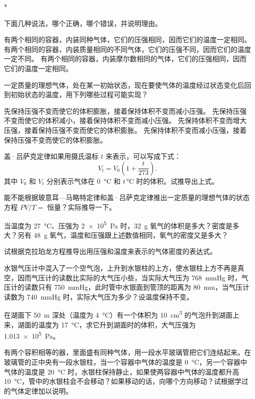 \begin{Exercise}*
\begin{question}
	\item 下面几种说法，哪个正确，哪个错误，并说明理由。
	\begin{tasks}
		\task 有两个相同的容器，内装同种气体，它们的压强相同，因而它们的温度一定相同。
		\task 有两个相同的容器，内装质量相同的不同气体，它们的压强不同，因而它们的温度一定不同。
		\task 有两个相同的容器，内装摩尔数相同的气体，它们的压强相同，因而它们的温度一定相同。
	\end{tasks}
	\item 一定质量的理想气体，处在某一初始状态，现在要使气体的温度经过状态变化后回到初始状态的温度，用下列哪些过程可能实现？
	\begin{tasks}
		\task 先保持压强不变而使它的体积膨胀，接着保持体积不变而减小压强。
		\task 先保持压强不变而使它的体积减小，接着保持体积不变而减小压强。
		\task 先保持体积不变而增大压强，接着保持压强不变而使它的体积膨胀。
		\task 先保持体积不变而减小压强，接着保持压强不变而使它的体积膨胀。	 
	\end{tasks}
	\item 盖·吕萨克定律如果用摄氏温标 $t$ 来表示，可以写成下式：
	\[V_t=V_0\left(1+\frac{t}{273}\right).\]
	其中 $V_0$ 和 $V_t$ 分别表示气体在 \qty{0}{\celsius} 和 $t$\,\unit{\celsius} 时的体积。试推导出上式。
	\item 能不能根据玻意耳—马略特定律和盖·吕萨克定律推出一定质量的理想气体的状态方程 $PV/T=$ 恒量？实际推导一下。
	\item 当温度为 \qty{27}{\celsius}、压强为 \qty{2e5}{Pa} 时，\qty{32}{g} 氧气的体积是多大？密度是多大？另有 \qty{48}{g} 氧气，温度和压强跟上述数值相同，氧气的密度又是多大？	
	\item 试根据克拉珀龙方程推导出用压强和温度来表示的气体密度的表达式。
	\item 水银气压计中混入了一个空气泡，上升到水银柱的上方，使水银柱上方不再是真空，因而气压计的读数比实际的大气压小些，当实际大气压为 \qty{768}{mmHg} 时，气压计的读数只有 \qty{750}{mmHg}，此时管中水银面到管顶的距离为 \qty{80}{mm}，当气压计读数为 \qty{740}{mmHg} 时，实际大气压为多少？设温度保持不变。
	\item 在湖面下 \qty{50}{m} 深处（温度为 \qty{4}{\celsius}）有一个体积为 \qty{10}{cm^3} 的气泡升到湖面上来，湖面的温度为 \qty{17}{\celsius}，求它升到湖面时的体积，大气压强为 \qty{1.013e5}{Pa}。
	\item 有两个容积相等的器，里面盛有同种气体，用一段水平玻璃管把它们连结起来。在玻璃管的正中央有一段水银柱，当一个容器中气体的温度是 \qty{0}{\celsius}，另一个容器中气体的温度是 \qty{20}{\celsius} 时，水银柱保持静止，如果使两容器中气体的温度都升高 \qty{10}{\celsius}，管中的水银柱会不会移动？如果移动的话，向哪个方向移动？试根据学过的气体定律加以说明。

\end{question}
\end{Exercise}
